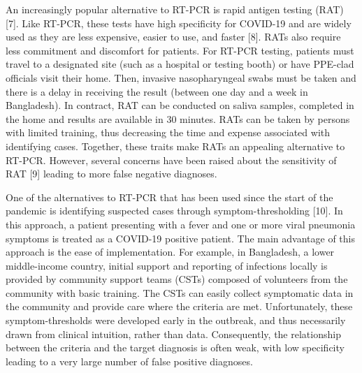 \documentclass[]{elsarticle} %
\begin{document}
An increasingly popular alternative to RT-PCR is rapid antigen testing
(RAT) {[}7{]}. Like RT-PCR, these tests have high specificity for
COVID-19 and are widely used as they are less expensive, easier to use,
and faster {[}8{]}. RATs also require less commitment and discomfort for
patients. For RT-PCR testing, patients must travel to a designated site
(such as a hospital or testing booth) or have PPE-clad officials visit
their home. Then, invasive nasopharyngeal swabs must be taken and there
is a delay in receiving the result (between one day and a week in
Bangladesh). In contract, RAT can be conducted on saliva samples,
completed in the home and results are available in 30 minutes. RATs can
be taken by persons with limited training, thus decreasing the time and
expense associated with identifying cases. Together, these traits make
RATs an appealing alternative to RT-PCR. However, several concerns have
been raised about the sensitivity of RAT {[}9{]} leading to more false
negative diagnoses.

One of the alternatives to RT-PCR that has been used since the start of
the pandemic is identifying suspected cases through symptom-thresholding
{[}10{]}. In this approach, a patient presenting with a fever and one or
more viral pneumonia symptoms is treated as a COVID-19 positive patient.
The main advantage of this approach is the ease of implementation. For
example, in Bangladesh, a lower middle-income country, initial support
and reporting of infections locally is provided by community support
teams (CSTs) composed of volunteers from the community with basic
training. The CSTs can easily collect symptomatic data in the community
and provide care where the criteria are met. Unfortunately, these
symptom-thresholds were developed early in the outbreak, and thus
necessarily drawn from clinical intuition, rather than data.
Consequently, the relationship between the criteria and the target
diagnosis is often weak, with low specificity leading to a very large
number of false positive diagnoses.
\end{document}
